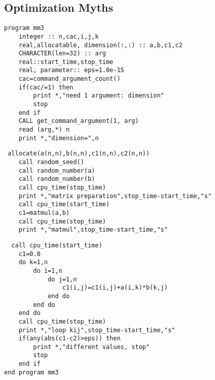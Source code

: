 \documentclass{beamer}
\begin{document}
\subsection{Optimization Myths}
\begin{frame} [fragile] 
\begin{verbatim}
program mm3
    integer :: n,cac,i,j,k
    real,allocatable, dimension(:,:) :: a,b,c1,c2
    CHARACTER(len=32) :: arg
    real::start_time,stop_time
    real, parameter:: eps=1.0e-15
    cac=command_argument_count()
    if(cac/=1) then
        print *,"need 1 argument: dimension"
        stop
    end if    
    CALL get_command_argument(1, arg)
    read (arg,*) n
    print *,"dimension=",n
\end{verbatim}
\end{frame}
\begin{frame} [fragile] 
\begin{verbatim}
 allocate(a(n,n),b(n,n),c1(n,n),c2(n,n))
    call random_seed()
    call random_number(a)
    call random_number(b)  
    call cpu_time(stop_time)
    print *,"matrix preparation",stop_time-start_time,"s"
    call cpu_time(start_time)
    c1=matmul(a,b)
    call cpu_time(stop_time)
    print *,"matmul",stop_time-start_time,"s"

\end{verbatim}
\end{frame}
\begin{frame} [fragile] 
\begin{verbatim}
  call cpu_time(start_time)
    c1=0.0
    do k=1,n
        do i=1,n
            do j=1,n
                c1(i,j)=c1(i,j)+a(i,k)*b(k,j)
            end do
        end do
    end do
    call cpu_time(stop_time)
    print *,"loop kij",stop_time-start_time,"s"
    if(any(abs(c1-c2)>eps)) then
        print *,"different values, stop"
        stop
    end if
end program mm3
\end{verbatim}
\end{frame}
\end{document}
